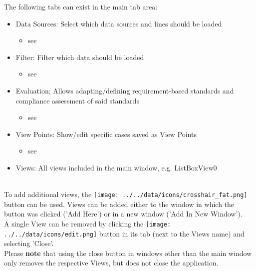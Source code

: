 The following tabs can exist in the main tab area:
\begin{itemize}
 \item Data Sources: Select which data sources and lines should be loaded
  \begin{itemize}
 \item see 
 \end{itemize}
 \item Filter: Filter which data should be loaded
   \begin{itemize}
 \item see 
 \end{itemize}
 \item Evaluation: Allows adapting/defining requirement-based standards and compliance assessment of said standards
 \begin{itemize}
 \item see 
 \end{itemize}
 \item View Points: Show/edit specific cases saved as View Points
  \begin{itemize}
 \item see 
 \end{itemize}
 \item Views: All views included in the main window, e.g. ListBoxView0
\end{itemize}
\  \\

To add additional views, the \texttt{[image: ../../data/icons/crosshair\_fat.png]} button can be used. 
Views can be added either to the window in which the button was clicked ('Add Here') or in a new window ('Add In New Window'). \\

A single View can be removed by clicking the \texttt{[image: ../../data/icons/edit.png]} button in its tab (next to the Views name) and selecting 'Close'. \\

Please \textbf{note} that using the close button in windows other than the main window only removes the respective Views, but does not close the application.



